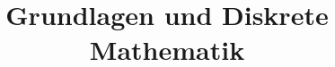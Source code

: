 \documentclass[a4paper,11pt]{scrreprt}
\theoremstyle{definition}
\begin{document}


\title{Grundlagen und Diskrete Mathematik}


\date{}
\maketitle

\tableofcontents




%



\newpage
\nocite{*}



%
\end{document}
